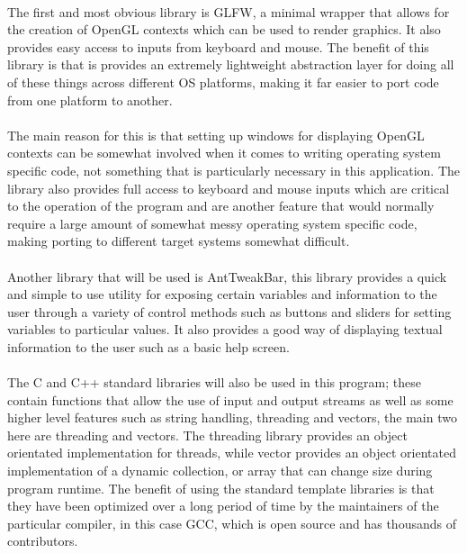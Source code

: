 \paragraph{}
The first and most obvious library is GLFW, a minimal wrapper that allows for the creation of OpenGL contexts which can be used to render graphics. It also provides easy access to inputs from keyboard and mouse. The benefit of this library is that is provides an extremely lightweight abstraction layer for doing all of these things across different OS platforms, making it far easier to port code from one platform to another.

\paragraph{}
The main reason for this is that setting up windows for displaying OpenGL contexts can be somewhat involved when it comes to writing operating system specific code, not something that is particularly necessary in this application. The library also provides full access to keyboard and mouse inputs which are critical to the operation of the program and are another feature that would normally require a large amount of somewhat messy operating system specific code, making porting to different target systems somewhat difficult.

\paragraph{}
Another library that will be used is AntTweakBar, this library provides a quick and simple to use utility for exposing certain variables and information to the user through a variety of control methods such as buttons and sliders for setting variables to particular values. It also provides a good way of displaying textual information to the user such as a basic help screen.

\paragraph{}
The C and C++ standard libraries will also be used in this program; these contain functions that allow the use of input and output streams as well as some higher level features such as string handling, threading and vectors, the main two here are threading and vectors. The threading library provides an object orientated implementation for threads, while vector provides an object orientated implementation of a dynamic collection, or array that can change size during program runtime. The benefit of using the standard template libraries is that they have been optimized over a long period of time by the maintainers of the particular compiler, in this case GCC, which is open source and has thousands of contributors.

